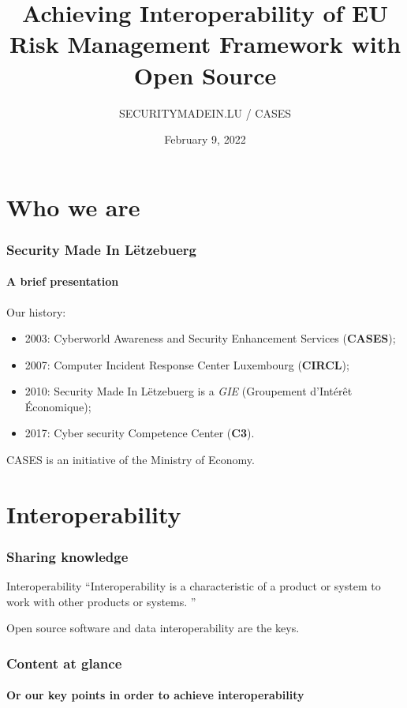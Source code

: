 \documentclass[]{beamer}
\title[EU Risk Management Framework]{Achieving Interoperability of EU Risk Management Framework with Open Source}
\author[Team CASES]{SECURITYMADEIN.LU / CASES}
\institute[]{\href{https://www.cases.lu}{Cyberworld Awareness and Security Enhancements Services}}
\date{February 9, 2022}
\begin{document}
\begin{frame}
    \titlepage
\end{frame}


%
%
\section*{Who we are}
\begin{frame}
    \frametitle{Security Made In Lëtzebuerg}
    \framesubtitle{A brief presentation}
    Our history:
    \begin{center}
        \begin{itemize}
            \item 2003: Cyberworld Awareness and Security Enhancement Services (\textbf{CASES});
            \item 2007: Computer Incident Response Center Luxembourg (\textbf{CIRCL});
            \item 2010: Security Made In Lëtzebuerg is a \textit{GIE} (Groupement d’Intérêt Économique);
            \item 2017: Cyber security Competence Center (\textbf{C3}).
        \end{itemize}
    \end{center}
    \bigskip
    CASES is an initiative of the Ministry of Economy.
\end{frame}


\section*{Interoperability}
\begin{frame}
    \frametitle{Sharing knowledge}
    \begin{block}{Interoperability}
        \textquotedblleft Interoperability is a characteristic of a product or system to work with other products or systems. \textquotedblright
    \end{block}
    \bigskip
    \begin{center}
        Open source software and data interoperability are the keys.
    \end{center}
\end{frame}


\setcounter{tocdepth}{1}
\begin{frame}
    \frametitle{Content at glance}
    \framesubtitle{Or our key points in order to achieve interoperability}
    \tableofcontents
\end{frame}
\setcounter{tocdepth}{4}
\end{document}
